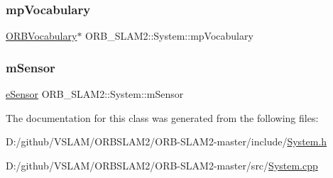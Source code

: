 \mbox{\label{class_o_r_b___s_l_a_m2_1_1_system_a30df3414ecc346463295d8138c80af2f}} 
\subsubsection{\texorpdfstring{mp\+Vocabulary}{mpVocabulary}}
{\footnotesize\ttfamily \mbox{\hyperlink{namespace_o_r_b___s_l_a_m2_a2fafba714858cab1bb18d438e2e83c5d}{O\+R\+B\+Vocabulary}}$\ast$ O\+R\+B\+\_\+\+S\+L\+A\+M2\+::\+System\+::mp\+Vocabulary\hspace{0.3cm}{\ttfamily [private]}}

\mbox{\label{class_o_r_b___s_l_a_m2_1_1_system_a6e2c6a2e12b887481a564e0f95912d40}} 
\subsubsection{\texorpdfstring{m\+Sensor}{mSensor}}
{\footnotesize\ttfamily \mbox{\hyperlink{class_o_r_b___s_l_a_m2_1_1_system_a3f14b84bb9663e1129e649e592bd14cf}{e\+Sensor}} O\+R\+B\+\_\+\+S\+L\+A\+M2\+::\+System\+::m\+Sensor\hspace{0.3cm}{\ttfamily [private]}}



The documentation for this class was generated from the following files\+:\begin{DoxyCompactItemize}
\item 
D\+:/github/\+V\+S\+L\+A\+M/\+O\+R\+B\+S\+L\+A\+M2/\+O\+R\+B-\/\+S\+L\+A\+M2-\/master/include/\mbox{\hyperlink{_system_8h}{System.\+h}}\item 
D\+:/github/\+V\+S\+L\+A\+M/\+O\+R\+B\+S\+L\+A\+M2/\+O\+R\+B-\/\+S\+L\+A\+M2-\/master/src/\mbox{\hyperlink{_system_8cpp}{System.\+cpp}}\end{DoxyCompactItemize}
